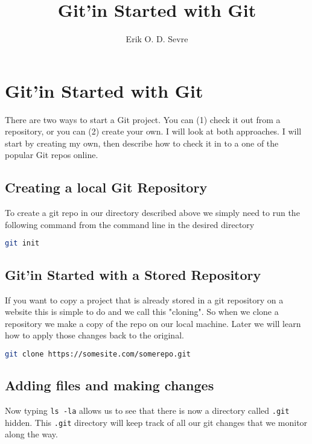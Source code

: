 \documentclass[a4paper]{spie} %
\author{Erik O. D. Sevre}
\title{Git'in Started with Git}
\begin{document}
\maketitle


\section*{Git'in Started with Git}

There are two ways to start a Git project. You can (1) check it out from a repository, or you can (2) create your own. I will look at both approaches. I will start by creating my own, then describe how to check it in to a one of the popular Git repos online.

\subsection*{Creating a local Git Repository}

To create a git repo in our directory described above we simply need to run the following command from the command line in the desired directory
\begin{lstlisting}[language=bash]
git init
\end{lstlisting}

\subsection*{Git'in Started with a Stored Repository}

If you want to copy a project that is already stored in a git repository on a website this is simple to do and we call this "cloning". So when we clone a repository we make a copy of the repo on our local machine. Later we will learn how to apply those changes back to the original.

\begin{lstlisting}[language=bash]
git clone https://somesite.com/somerepo.git
\end{lstlisting}


\subsection*{Adding files and making changes}

Now typing \texttt{ls -la} allows us to see that there is now a directory called \texttt{.git} hidden. This \texttt{.git} directory will keep track of all our git changes that we monitor along the way.
\end{document}
